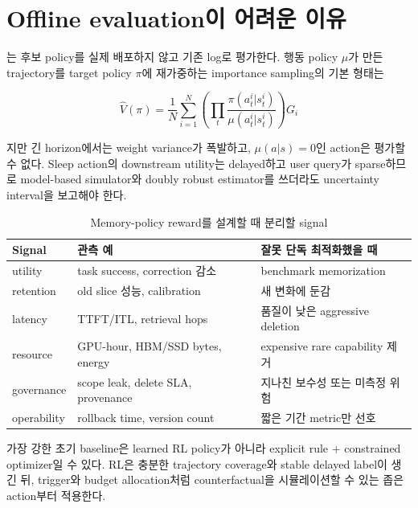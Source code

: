 \section{Offline evaluation이 어려운 이유}

는 후보 policy를 실제 배포하지 않고 기존 log로
평가한다. 행동 policy $\mu$가 만든 trajectory를 target policy $\pi$에 재가중하는 importance sampling의
기본 형태는

\begin{equation}
\hat V(\pi)=\frac{1}{N}\sum_{i=1}^{N}
\left(\prod_t\frac{\pi(a_t^i|s_t^i)}{\mu(a_t^i|s_t^i)}\right)G_i
\end{equation}

지만 긴 horizon에서는 weight variance가 폭발하고, $\mu(a|s)=0$인 action은 평가할 수 없다. Sleep
action의 downstream utility는 delayed하고 user query가 sparse하므로 model-based simulator와 doubly
robust estimator를 쓰더라도 uncertainty interval을 보고해야 한다.

\begin{table}[htbp]
\centering
\caption{Memory-policy reward를 설계할 때 분리할 signal}
\label{tab:bg-memory-policy-reward}
\small
\begin{tabularx}{\textwidth}{p{} X X}
\toprule
Signal & 관측 예 & 잘못 단독 최적화했을 때 \\
\midrule
utility & task success, correction 감소 & benchmark memorization \\
retention & old slice 성능, calibration & 새 변화에 둔감 \\
latency & TTFT/ITL, retrieval hops & 품질이 낮은 aggressive deletion \\
resource & GPU-hour, HBM/SSD bytes, energy & expensive rare capability 제거 \\
governance & scope leak, delete SLA, provenance & 지나친 보수성 또는 미측정 위험 \\
operability & rollback time, version count & 짧은 기간 metric만 선호 \\
\bottomrule
\end{tabularx}
\end{table}

가장 강한 초기 baseline은 learned RL policy가 아니라 explicit rule + constrained optimizer일 수 있다.
RL은 충분한 trajectory coverage와 stable delayed label이 생긴 뒤, trigger와 budget allocation처럼
counterfactual을 시뮬레이션할 수 있는 좁은 action부터 적용한다.
